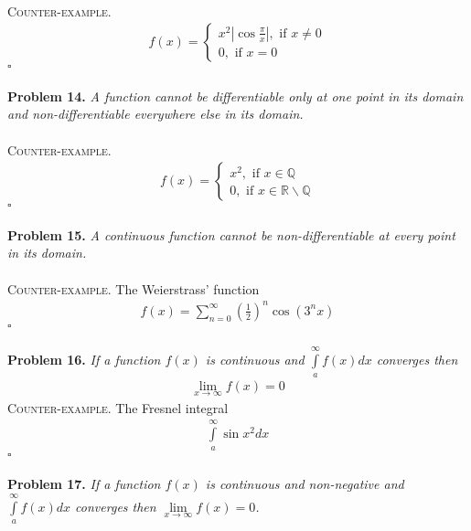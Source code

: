 \documentclass[a4paper]{article}
\numberwithin{equation}{section}
\begin{document}
\\
\textsc{Counter-example.} 
\begin{align}
f\left( x \right) = \left\{ {\begin{array}{*{20}{c}}
{{x^2}\left| {\cos \frac{\pi }{x}} \right|,\mbox{ if } x \ne 0}\\
{0,\mbox{ if } x = 0}
\end{array}} \right.
\end{align}
\hfill $\square$\\
\\
\textbf{Problem 14.} \textit{A function cannot be differentiable only at one point in its domain and non-differentiable everywhere else in its domain.} \\
\\
\textsc{Counter-example.} 
\begin{align}
f\left( x \right) = \left\{ {\begin{array}{*{20}{c}}
{x^2,\mbox{ if } x \in \mathbb{Q}}\\
{ 0,\mbox{ if } x \in \mathbb{R}\backslash \mathbb{Q} }
\end{array}} \right.
\end{align}
\hfill $\square$\\
\\
\textbf{Problem 15.} \textit{A continuous function cannot be non-differentiable at every point in its domain.}\\
\\
\textsc{Counter-example.} The Weierstrass' function 
\begin{align}
f\left( x \right) = \sum\limits_{n = 0}^\infty  {{{\left( {\frac{1}{2}} \right)}^n}\cos \left( {{3^n}x} \right)}
\end{align}
\hfill $\square$\\
\\
\textbf{Problem 16.} \textit{If a function $f(x)$ is continuous and $\int\limits_a^\infty  {f\left( x \right)dx} $ converges then} 
\begin{align}
\mathop {\lim }\limits_{x \to \infty } f\left( x \right) = 0
\end{align}
\textsc{Counter-example.} The Fresnel integral
\begin{align}
\int\limits_a^\infty  {\sin {x^2}dx}
\end{align}
\hfill $\square$\\
\\
\textbf{Problem 17.} \textit{If a function $ f(x)$ is continuous and non-negative and $\int\limits_a^\infty  {f\left( x \right)dx} $ converges then $\mathop {\lim }\limits_{x \to \infty } f\left( x \right) = 0$. }\\
\end{document}
